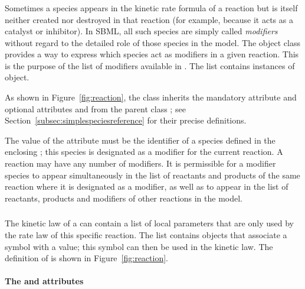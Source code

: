 \subsubsection{}
\label{subsec:modifierreference}

Sometimes a species appears in the kinetic rate formula of a
reaction but is itself neither created nor destroyed in that
reaction (for example, because it acts as a catalyst or
inhibitor).  In SBML, all such species are simply called
\emph{modifiers} without regard to the detailed role of those
species in the model.  The \Reaction object class provides a way to
express which species act as modifiers in a given reaction.  This
is the purpose of the list of modifiers available in \Reaction.
The list contains instances of \ModifierSpeciesReference
object.

As shown in Figure~\vref{fig:reaction}, the
\ModifierSpeciesReference class inherits the mandatory attribute
 and optional attributes  and 
from the parent class \SimpleSpeciesReference; see
Section~\ref{subsec:simplespeciesreference} for their precise
definitions.

The value of the  attribute must be the identifier of a
species defined in the enclosing \Model; this species is
designated as a modifier for the current reaction.  A reaction may
have any number of modifiers.  It is permissible for a modifier
species to appear simultaneously in the list of reactants and
products of the same reaction where it is designated as a
modifier, as well as to appear in the list of reactants, products
and modifiers of other reactions in the model.

\subsubsection{}
\label{subsec:localparameter}

The kinetic law of a \Reaction can contain a list of local parameters that
are only used by the rate law of this specific reaction. The list contains
\LocalParameter objects that associate a symbol  with a
value; this symbol can then be used in the kinetic law. 
The definition of \LocalParameter is shown in Figure~\vref{fig:reaction}.


\paragraph{The  and  attributes}

